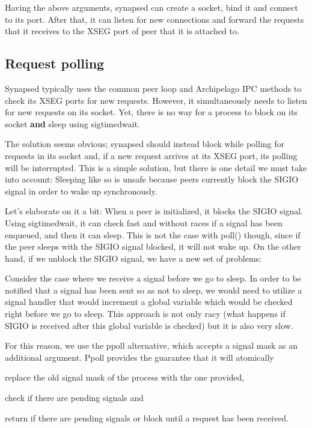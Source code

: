 Having the above arguments, synapsed can create a socket, bind it and connect 
to its port. After that, it can listen for new connections and forward the 
requests that it receives to the XSEG port of peer that it is attached to.

\subsection{Request polling}\label{sec:poll-synapsed}

Synapsed typically uses the common peer loop and Archipelago IPC methods to 
check its XSEG ports for new requests. However, it simultaneously needs to 
listen for new requests on its socket. Yet, there is no way for a process to 
block on its socket \textbf{and} sleep using sigtimedwait.

The solution seems obvious; synapsed should instead block while polling for 
requests in its socket and, if a new request arrives at its XSEG port, its 
polling will be interrupted. This is a simple solution, but there is one
detail we must take into account: Sleeping like so is unsafe because peers 
currently block the SIGIO signal in order to wake up synchronously.

Let's elaborate on it a bit: When a peer is initialized, it blocks the SIGIO 
signal. Using sigtimedwait, it can check fast and without races if a signal has 
been enqueued, and then it can sleep. This is not the case with poll() though, 
since if the peer sleeps with the SIGIO signal blocked, it will not wake up.  
On the other hand, if we unblock the SIGIO signal, we have a new set of 
problems:

Consider the case where we receive a signal before we go to sleep. In order to 
be notified that a signal has been sent so as not to sleep, we would need to 
utilize a signal handler that would increment a global variable which would be 
checked right before we go to sleep. This approach is not only racy (what 
happens if SIGIO is received after this global variable is checked) but it is 
also very slow.

For this reason, we use the ppoll alternative, which accepts a signal mask as 
an additional argument. Ppoll provides the guarantee that it will atomically 
\begin{inparaenum}[i.]
\item replace the old signal mask of the process with the one provided,
\item check if there are pending signals and
\item return if there are pending signals or block until a request has been 
	received.
\end{inparaenum}

